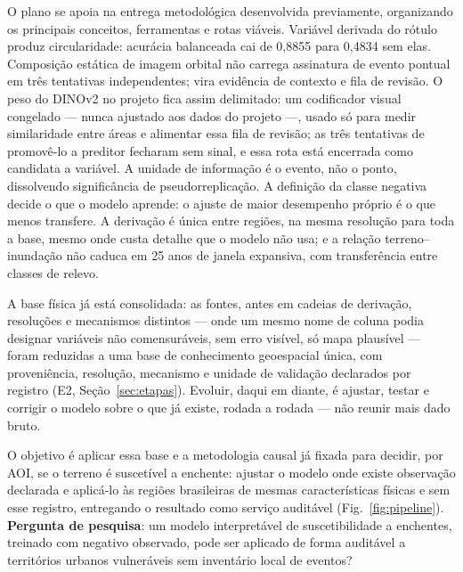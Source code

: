 \documentclass[conference]{IEEEtran}
\begin{document}
O plano se apoia na entrega metodológica desenvolvida previamente,
organizando os principais conceitos, ferramentas e rotas viáveis. Variável
derivada do rótulo produz circularidade: acurácia balanceada cai de 0,8855
para 0,4834 sem elas. Composição estática de imagem orbital não carrega
assinatura de evento pontual em três tentativas independentes; vira
evidência de contexto e fila de revisão. O peso do DINOv2 no projeto fica
assim delimitado: um codificador visual congelado --- nunca ajustado aos
dados do projeto ---, usado só para medir similaridade entre áreas e
alimentar essa fila de revisão; as três tentativas de promovê-lo a preditor
fecharam sem sinal, e essa rota está encerrada como candidata a variável. A
unidade de informação é o evento, não o ponto, dissolvendo significância de
pseudorreplicação. A definição da classe negativa decide o que o modelo
aprende: o ajuste de maior desempenho próprio é o que menos transfere. A
derivação é única entre regiões, na mesma resolução para toda a base, mesmo
onde custa detalhe que o modelo não usa; e a relação terreno--inundação não
caduca em 25 anos de janela expansiva, com transferência entre classes de
relevo.

A base física já está consolidada: as fontes, antes em cadeias de
derivação, resoluções e mecanismos distintos --- onde um mesmo nome de
coluna podia designar variáveis não comensuráveis, sem erro visível, só
mapa plausível --- foram reduzidas a uma base de conhecimento geoespacial
única, com proveniência, resolução, mecanismo e unidade de validação
declarados por registro (E2, Seção~\ref{sec:etapas}). Evoluir, daqui em
diante, é ajustar, testar e corrigir o modelo sobre o que já existe, rodada
a rodada --- não reunir mais dado bruto.

O objetivo é aplicar essa base e a metodologia causal já fixada para
decidir, por AOI, se o terreno é suscetível a enchente: ajustar o modelo
onde existe observação declarada e aplicá-lo às regiões brasileiras de
mesmas características físicas e sem esse registro, entregando o resultado
como serviço auditável (Fig.~\ref{fig:pipeline}).
\textbf{Pergunta de pesquisa}: um modelo interpretável de suscetibilidade a
enchentes, treinado com negativo observado, pode ser aplicado de forma
auditável a territórios urbanos vulneráveis sem inventário local de
eventos?
\end{document}
